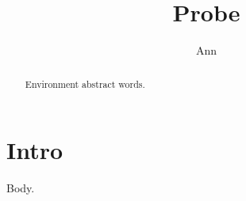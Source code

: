 \documentclass{article}
\begin{document}
\title{Probe}\author{Ann}
\maketitle
{}
\begin{abstract}
Environment abstract words.
\end{abstract}
\section{Intro}
Body.
\end{document}
